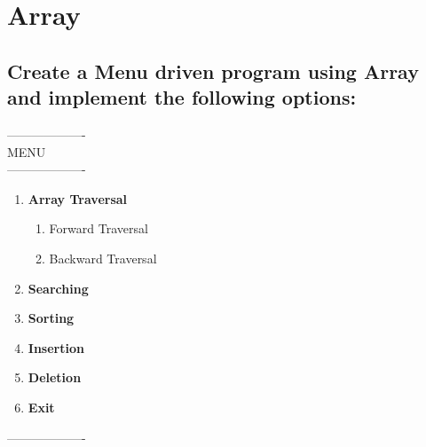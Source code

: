 \documentclass{report}
\begin{document}

\newpage
\large{\tableofcontents}
\clearpage
{}


\chapter{Array}
\section{Create a Menu driven program using Array and implement the following options:} 
\begin{center}
  ------------------- \\
            MENU \\
  ------------------- \\
  \begin{varwidth}{\textwidth}
    \begin{enumerate}
      \item  \textbf {Array Traversal}
        \begin{enumerate}[label=(\Roman*)]
          \item Forward Traversal
          \item Backward Traversal
        \end{enumerate}
      \item  \textbf {Searching}
      \item  \textbf {Sorting}
      \item  \textbf {Insertion}
      \item  \textbf {Deletion}
      \item  \textbf {Exit}
    \end{enumerate}
    ------------------- \\
  \end{varwidth}
\end{center}   
\end{document}
